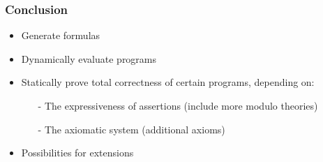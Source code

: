 \begin{frame}[c]
  \frametitle{Conclusion}
  \begin{itemize}
    \item Generate formulas
    \item Dynamically evaluate programs
    \item Statically prove total correctness of certain programs, depending on:
          \begin{itemize}
            \item[-] The expressiveness of assertions (include more modulo theories)
            \item[-] The axiomatic system (additional axioms)
          \end{itemize}
    \item Possibilities for extensions
  \end{itemize}
  \centering
  \Huge{👻}
\end{frame}
